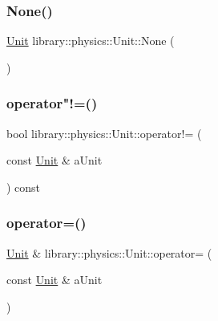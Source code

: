 \mbox{\label{classlibrary_1_1physics_1_1_unit_ab25dd57cb71168898324ac78b43374ac}} 
\subsubsection{\texorpdfstring{None()}{None()}}
{\footnotesize\ttfamily \hyperlink{classlibrary_1_1physics_1_1_unit}{Unit} library\+::physics\+::\+Unit\+::\+None (\begin{DoxyParamCaption}{ }\end{DoxyParamCaption})\hspace{0.3cm}{\ttfamily [static]}}

\mbox{\label{classlibrary_1_1physics_1_1_unit_a2fc9c3b0ac228c6c0fedb2f63274a35f}} 
\subsubsection{\texorpdfstring{operator"!=()}{operator!=()}}
{\footnotesize\ttfamily bool library\+::physics\+::\+Unit\+::operator!= (\begin{DoxyParamCaption}\item[{const \hyperlink{classlibrary_1_1physics_1_1_unit}{Unit} \&}]{a\+Unit }\end{DoxyParamCaption}) const}

\mbox{\label{classlibrary_1_1physics_1_1_unit_af82a0c6b4bb9b9724823b6492c72aa46}} 
\subsubsection{\texorpdfstring{operator=()}{operator=()}}
{\footnotesize\ttfamily \hyperlink{classlibrary_1_1physics_1_1_unit}{Unit} \& library\+::physics\+::\+Unit\+::operator= (\begin{DoxyParamCaption}\item[{const \hyperlink{classlibrary_1_1physics_1_1_unit}{Unit} \&}]{a\+Unit }\end{DoxyParamCaption})}

